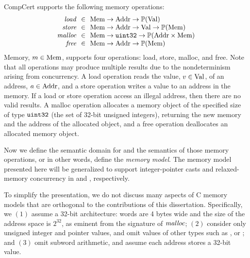 CompCert supports the following memory operations:
\[
\begin{array}{r@{~~}c@{~~}l}
  \memLoad &\in& \rtlMem \to \rtlAddr \to \powset{\rtlVal} \\
  \memStore &\in& \rtlMem \to \rtlAddr \to \rtlVal \to \powset{\rtlMem} \\
  \memMalloc &\in& \rtlMem \to \usize \to \powset{\rtlAddr \times \rtlMem} \\
  \memFree &\in& \rtlMem \to \rtlAddr \to \powset{\rtlMem} \\
\end{array}
\]
%
\noindent Memory, $m\in\mathrm{Mem}$, supports four operations: load, store, malloc, and free.  Note that
all operations may produce multiple results due to the nondeterminism arising from \eg{}
concurrency.  A load operation reads the value, $v\in\mathrm{Val}$, of an address, $a\in\mathrm{Addr}$, and a
store operation writes a value to an address in the memory.  If a load or store operation access an
illegal address, then there are no valid results.  A malloc operation allocates a memory object of
the specified size of type $\mathtt{uint32}$ (the set of 32-bit unsigned integers), returning the new memory
and the address of the allocated object, and a free operation deallocates an allocated memory
object.

Now we define the semantic domain for and the semantics of those memory operations, or in other
words, define the \emph{memory model}.  The memory model presented here will be generalized to
support integer-pointer casts and relaxed-memory concurrency in  and
, respectively.

To simplify the presentation, we do not discuss many aspects of C memory models that are orthogonal
to the contributions of this dissertation.  Specifically, we $(1)$ assume a 32-bit architecture:
words are 4 bytes wide and the size of the address space is $2^{32}$, as eminent from the signature
of $\mathit{malloc}$; $(2)$ consider only unsigned integer and pointer values, and omit values of other
types such as \isize,  or ; and $(3)$ omit subword arithmetic, and assume
each address stores a 32-bit value.


